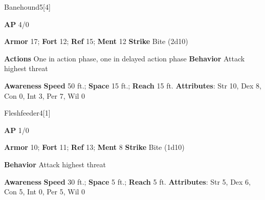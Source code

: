 \begin{monsection}{Banehound}{5}[4]
\vspace{-1em}\vspace{-1em}
\begin{spellcontent}
\begin{spelltargetinginfo}
{\textbf{AP} 4/0}

\pari \textbf{Armor} 17;
\textbf{Fort} 12;
\textbf{Ref} 15;
\textbf{Ment} 12
\pari \textbf{Strike} Bite  (2d10)


\pari \textbf{Actions} One in action phase, one in delayed action phase
\pari \textbf{Behavior} Attack highest threat
\end{spelltargetinginfo}
\end{spellcontent}

\begin{monsterfooter}
\pari \textbf{Awareness} 
\pari \textbf{Speed} 50 ft.;
\textbf{Space} 15 ft.;
\textbf{Reach} 15 ft.
\pari \textbf{Attributes}:
Str 10,
Dex 8,
Con 0,
Int 3,
Per 7,
Wil 0
\end{monsterfooter}
\end{monsection}

\begin{monsection}{Fleshfeeder}{4}[1]
\vspace{-1em}\vspace{-1em}
\begin{spellcontent}
\begin{spelltargetinginfo}
{\textbf{AP} 1/0}

\pari \textbf{Armor} 10;
\textbf{Fort} 11;
\textbf{Ref} 13;
\textbf{Ment} 8
\pari \textbf{Strike} Bite  (1d10)



\pari \textbf{Behavior} Attack highest threat
\end{spelltargetinginfo}
\end{spellcontent}

\begin{monsterfooter}
\pari \textbf{Awareness} 
\pari \textbf{Speed} 30 ft.;
\textbf{Space} 5 ft.;
\textbf{Reach} 5 ft.
\pari \textbf{Attributes}:
Str 5,
Dex 6,
Con 5,
Int 0,
Per 5,
Wil 0
\end{monsterfooter}
\end{monsection}

